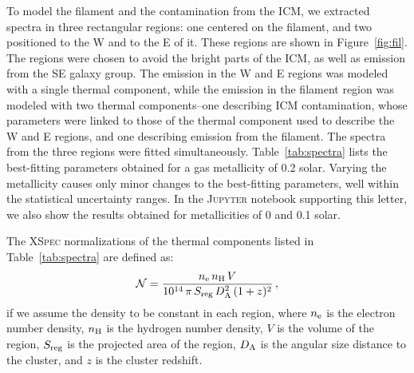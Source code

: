 To model the filament and the contamination from the ICM, we extracted spectra in three rectangular regions: one centered on the filament, and two positioned to the W and to the E of it. These regions are shown in Figure~\ref{fig:fil}. The regions were chosen to avoid the bright parts of the ICM, as well as emission from the SE galaxy group. The emission in the W and E regions was modeled with a single thermal component, while the emission in the filament region was modeled with two thermal components--one describing ICM contamination, whose parameters were linked to those of the thermal component used to describe the W and E regions, and one describing emission from the filament. The spectra from the three regions were fitted simultaneously. Table~\ref{tab:spectra} lists the best-fitting parameters obtained for a gas metallicity of 0.2 solar. Varying the metallicity causes only minor changes to the best-fitting parameters, well within the statistical uncertainty ranges. In the \textsc{Jupyter} notebook supporting this letter, we also show the results obtained for metallicities of 0 and 0.1 solar.

The \textsc{XSpec} normalizations of the thermal components listed in Table~\ref{tab:spectra} are defined as:
\begin{equation}
	\mathcal{N} = \frac{n_{\rm e} \, n_{\rm H} \, V}{10^{14} \, \pi \, S_{\rm reg} \, D_{\rm A}^2 \, (1+z)^2} \, , \nonumber
\end{equation}
if we assume the density to be constant in each region, where $n_{\rm e}$ is the electron number density, $n_{\rm H}$ is the hydrogen number density, $V$ is the volume of the region, $S_{\rm reg}$ is the projected area of the region, $D_{\rm A}$ is the angular size distance to the cluster, and $z$ is the cluster redshift.

